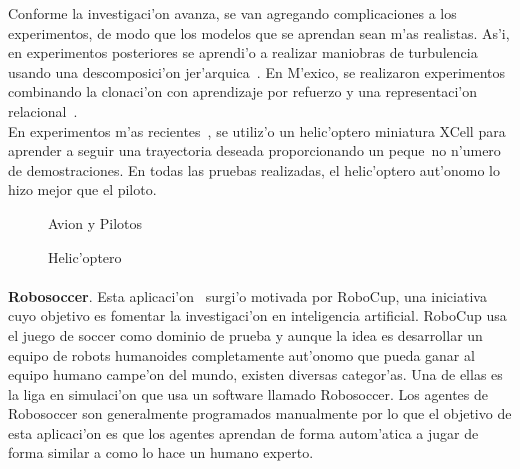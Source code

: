 \documentclass[11pt]{article}
\begin{document}
Conforme la investigaci'on avanza, se van agregando complicaciones a los experimentos, de modo que los modelos que se aprendan sean m'as realistas. As'i, en experimentos posteriores se aprendi'o a realizar maniobras de turbulencia usando una descomposici'on jer'arquica~\cite{Isaac03goal-directedlearning}. En M'exico, se realizaron experimentos combinando la clonaci'on con aprendizaje por refuerzo y una representaci'on relacional~\cite{Morales04learningto}.\\
En experimentos m'as recientes~\cite{heliCoates}, se utiliz'o un helic'optero miniatura XCell para aprender a seguir una trayectoria deseada proporcionando un peque~no n'umero de demostraciones. En todas las pruebas realizadas, el helic'optero aut'onomo lo hizo mejor que el piloto. %

\begin{figure}[h]
\begin{center}

\caption{Avion y Pilotos}
  \label{fig:volar}
\end{center}
\end{figure} 

\begin{figure}[h]

\centering
{}
\caption[Helic'optero]{Helic'optero} 
\label{fig:helicoptero}

\end{figure}

\paragraph{}
\noindent
\textbf{Robosoccer}. Esta aplicaci'on~\cite{soccerAler} surgi'o motivada por RoboCup, una iniciativa cuyo objetivo es fomentar la investigaci'on en inteligencia artificial. RoboCup usa el juego de soccer como dominio de prueba y aunque la idea es desarrollar un equipo de robots humanoides completamente aut'onomo que pueda ganar al equipo humano campe'on del mundo, existen diversas categor'as. Una de ellas es la liga en simulaci'on que usa un software llamado Robosoccer. Los agentes de Robosoccer son generalmente programados manualmente por lo que el objetivo de esta aplicaci'on es que los agentes aprendan de forma autom'atica a jugar de forma similar a como lo hace un humano experto.
\end{document}
